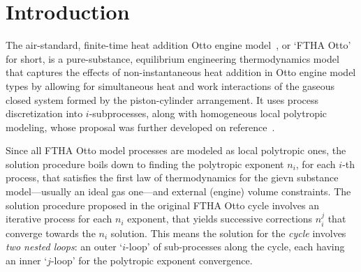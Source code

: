 \section{Introduction}

    The air-standard, finite-time heat addition Otto engine model~\cite{2017-NaaktgeborenC-IntJMechEngEduc}, or `FTHA Otto'  for
    short, is a pure-substance, equilibrium engineering thermodynamics model that captures the effects of non-instantaneous heat
    addition in Otto engine model types by allowing for simultaneous heat and work interactions of  the  gaseous  closed  system
    formed by the piston-cylinder arrangement. It uses process discretization  into  $i$-subprocesses,  along  with  homogeneous
    local        polytropic        modeling,        whose        proposal        was        further         developed         on
    reference~\cite{2020-NaaktgeborenC-Polytropic-engrXiv-rev02}.

    Since all FTHA Otto model processes are modeled as local polytropic ones, the solution procedure boils down to  finding  the
    polytropic exponent $n_i$, for each $i$-th process, that satisfies the first law of thermodynamics for the  gievn  substance
    model---usually an ideal gas one---and external (engine) volume constraints. The solution procedure proposed in the original
    FTHA Otto cycle involves an iterative process for each $n_i$ exponent,  that  yields  successive  corrections  $n_i^j$  that
    converge towards the $n_i$ solution. This means the solution for the \emph{cycle} involves \emph{two nested loops}: an outer
    `$i$-loop' of sub-processes along the cycle, each having an inner `$j$-loop' for the polytropic exponent convergence.

    


